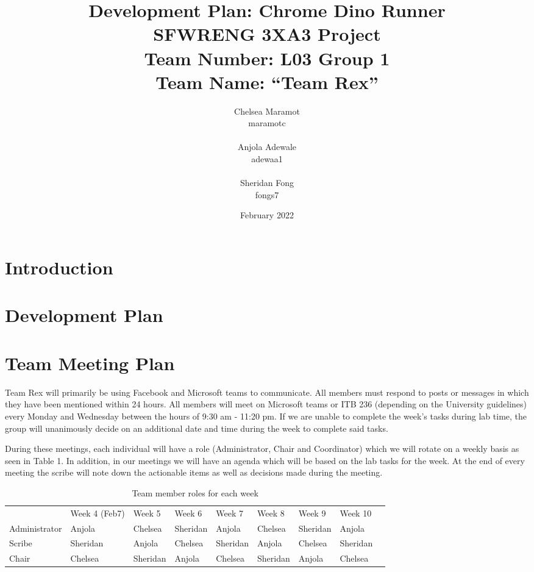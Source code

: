 \documentclass{article}
\title{Development Plan: Chrome Dino Runner \\ \bigskip \large SFWRENG 3XA3 Project \\ \bigskip \large Team Number: L03 Group 1 \\ \large Team Name: ``Team Rex'' }
\author{Chelsea Maramot \\ maramotc \\ \\ Anjola Adewale \\ adewaa1 \\ \\ Sheridan Fong \\ fongs7 }
\date{February 2022}
\begin{document}
	
	\maketitle
	
	\section{Introduction}
	
	\section{Development Plan}
	
	\section{Team Meeting Plan}
	
   Team Rex will primarily be using Facebook and Microsoft teams to communicate.
   All members must respond to posts or messages in which they have been mentioned within 24 hours. 
   All members will meet on Microsoft teams or ITB 236 (depending on the University guidelines) every Monday and Wednesday between the hours of 9:30 am - 11:20 pm. 
   If we are unable to complete the week’s tasks during lab time, the group will unanimously decide on an additional date and time during the week to complete said tasks.

During these meetings, each individual will have a role (Administrator, Chair and Coordinator) which we will rotate on a weekly basis as seen in Table 1. 
In addition, in our meetings we will have an agenda which will be based on the lab tasks for the week. 
At the end of every meeting the scribe will note down the actionable items as well as decisions made during the meeting.

	
	\begin{table}[]
		\begin{tabular}{|l|l|l|l|l|l|l|l|l}
		\cline{1-8}
					& Week 4 (Feb7) & Week 5   & Week 6   & Week 7   & Week 8   & Week 9   & Week 10  &  \\ \cline{1-8}
		Administrator & Anjola        & Chelsea  & Sheridan & Anjola   & Chelsea  & Sheridan & Anjola   &  \\ \cline{1-8}
		Scribe        & Sheridan      & Anjola   & Chelsea  & Sheridan & Anjola   & Chelsea  & Sheridan &  \\ \cline{1-8}
		Chair         & Chelsea       & Sheridan & Anjola   & Chelsea  & Sheridan & Anjola   & Chelsea  &  \\ \cline{1-8}
		\end{tabular}
		\caption{Team member roles for each week}
	\end{table}
\end{document}
